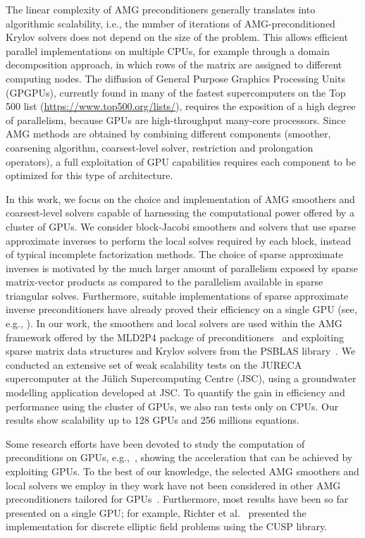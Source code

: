 The linear complexity of AMG preconditioners generally
translates into algorithmic scalability, i.e., the number of iterations
of AMG-preconditioned Krylov solvers does not depend on the size of the
problem. This allows efficient parallel implementations on multiple CPUs,
for example through a domain decomposition approach, in which rows of
the matrix are assigned to different computing nodes.
The diffusion of General Purpose Graphics Processing Units (GPGPUs),
currently found in many of the fastest supercomputers on the Top 500 list
(\url{https://www.top500.org/lists/}), requires the exposition of a high
degree of parallelism, because GPUs are high-throughput many-core processors.
Since AMG methods are obtained by combining different components (smoother,
coarsening algorithm, coarsest-level solver, restriction and prolongation operators),
a full exploitation of GPU capabilities requires each component to be optimized
for this type of architecture.

In this work, we focus on the choice and implementation of AMG smoothers
and coarsest-level solvers capable of harnessing the computational power offered by
a cluster of GPUs. We consider block-Jacobi smoothers and solvers that use sparse
approximate inverses to perform the local solves required by each block, instead of typical
incomplete factorization methods. The choice of sparse approximate inverses
is motivated by the much larger amount of parallelism exposed by
sparse matrix-vector products as compared to the parallelism available
in sparse triangular solves. Furthermore, suitable implementations of sparse approximate
inverse preconditioners have already proved their efficiency on a single GPU (see, e.g.,
\cite{BERTACCINI2016693,Lukash:2012}). 
In our work, the smoothers and local solvers are used within
the AMG framework offered by the MLD2P4 package of preconditioners~\cite{mld-toms,Dambra:2007} 
and exploiting sparse matrix data structures and Krylov solvers from
the PSBLAS  library~\cite{PSBLAS3}. 
We conducted an extensive set of weak scalability tests on the JURECA supercomputer at the J\"ulich Supercomputing Centre (JSC), 
using a groundwater modelling application developed at JSC. 
To quantify the gain in efficiency and performance using the cluster of GPUs, we also ran tests only on CPUs. 
Our results show scalability up to 128 GPUs and 256 millions equations.

Some research efforts have been devoted to study the computation of preconditions on GPUs, e.g.,~\cite{Dehnavi:2013}, 
showing the acceleration that can be achieved by exploiting GPUs. 
%
To the best of our knowledge, the selected AMG smoothers and local solvers we employ in they work 
have not been considered in other AMG preconditioners tailored for GPUs~\cite{BellDaltonOlson:2012}. 
Furthermore, most results have been so far presented on a single GPU; 
for example, Richter et al.~\cite{Richter:2014} presented the implementation for discrete elliptic field problems 
using the CUSP library. 

